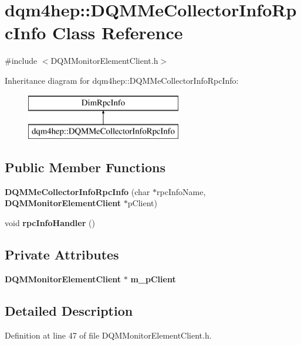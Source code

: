 \section{dqm4hep\+:\+:D\+Q\+M\+Me\+Collector\+Info\+Rpc\+Info Class Reference}
\label{classdqm4hep_1_1DQMMeCollectorInfoRpcInfo}


{\ttfamily \#include $<$D\+Q\+M\+Monitor\+Element\+Client.\+h$>$}

Inheritance diagram for dqm4hep\+:\+:D\+Q\+M\+Me\+Collector\+Info\+Rpc\+Info\+:\begin{figure}[H]
\begin{center}
\leavevmode
\includegraphics[height=2.000000cm]{classdqm4hep_1_1DQMMeCollectorInfoRpcInfo}
\end{center}
\end{figure}
\subsection*{Public Member Functions}
\begin{DoxyCompactItemize}
\item 
{\bf D\+Q\+M\+Me\+Collector\+Info\+Rpc\+Info} (char $\ast$rpc\+Info\+Name, {\bf D\+Q\+M\+Monitor\+Element\+Client} $\ast$p\+Client)
\item 
void {\bf rpc\+Info\+Handler} ()
\end{DoxyCompactItemize}
\subsection*{Private Attributes}
\begin{DoxyCompactItemize}
\item 
{\bf D\+Q\+M\+Monitor\+Element\+Client} $\ast$ {\bf m\+\_\+p\+Client}
\end{DoxyCompactItemize}


\subsection{Detailed Description}


Definition at line 47 of file D\+Q\+M\+Monitor\+Element\+Client.\+h.



